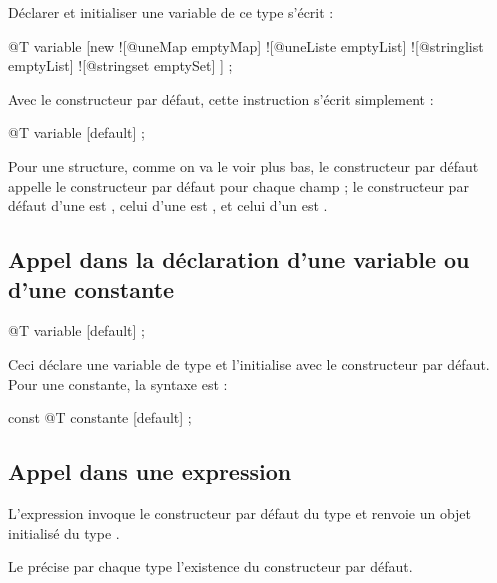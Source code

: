 Déclarer et initialiser une variable de ce type s'écrit :

\begin{galgascode}
@T variable [new
  ![@uneMap emptyMap]
  ![@uneListe emptyList]
  ![@stringlist emptyList]
  ![@stringset emptySet]
] ;
\end{galgascode}

Avec le constructeur par défaut, cette instruction s'écrit simplement :

\begin{galgascode}
@T variable [default] ;
\end{galgascode}

Pour une structure, comme on va le voir plus bas, le constructeur par défaut appelle le constructeur par défaut pour chaque champ ; le constructeur par défaut d'une  est , celui d'une  est , et celui d'un  est .


\subsection{Appel dans la déclaration d'une variable ou d'une constante}

\begin{galgascode}
@T variable [default] ;
\end{galgascode}

Ceci déclare une variable de type  et l'initialise avec le constructeur par défaut. Pour une constante, la syntaxe est :

\begin{galgascode}
const @T constante [default] ;
\end{galgascode}


\subsection{Appel dans une expression}

L'expression \galgas{[@T default]} invoque le constructeur par défaut du type  et renvoie un objet initialisé du type .


Le  précise par chaque type l'existence du constructeur par défaut.


